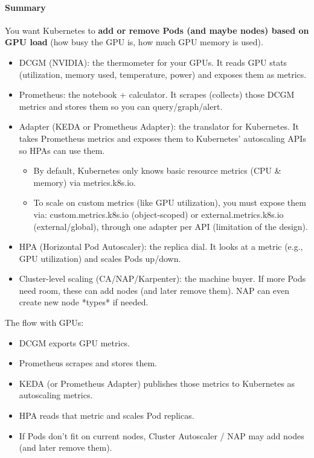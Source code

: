 \paragraph{Summary} You want Kubernetes to \textbf{add or remove Pods (and maybe nodes) based on GPU load} (\eg how busy the GPU is, how much GPU memory is used).
\begin{itemize}
	\item DCGM (NVIDIA): the thermometer for your GPUs. It reads GPU stats (utilization, memory used, temperature, power) and exposes them as metrics.
	\item Prometheus: the notebook + calculator. It scrapes (collects) those DCGM metrics and stores them so you can query/graph/alert.
	\item Adapter (KEDA or Prometheus Adapter): the translator for Kubernetes. It takes Prometheus metrics and exposes them to Kubernetes' autoscaling APIs so HPAs can use them.
		\begin{itemize}
			\item By default, Kubernetes only knows basic resource metrics (CPU
				\& memory) via metrics.k8s.io.
			\item To scale on custom metrics (like GPU utilization), you must
				expose them via: custom.metrics.k8s.io (object-scoped) or
				external.metrics.k8s.io (external/global), through one adapter
				per API (limitation of the design).
		\end{itemize}
	\item HPA (Horizontal Pod Autoscaler): the replica dial. It looks at a metric (e.g., GPU utilization) and scales Pods up/down.
	\item Cluster-level scaling (CA/NAP/Karpenter): the machine buyer. If more Pods need room, these can add nodes (and later remove them). NAP can even create new node *types* if needed.
\end{itemize}

The flow with GPUs:
\begin{itemize}
	\item DCGM exports GPU metrics.
	\item Prometheus scrapes and stores them.
	\item KEDA (or Prometheus Adapter) publishes those metrics to Kubernetes as autoscaling metrics.
	\item HPA reads that metric and scales Pod replicas.
	\item If Pods don't fit on current nodes, Cluster Autoscaler / NAP may add nodes (and later remove them).
\end{itemize}


